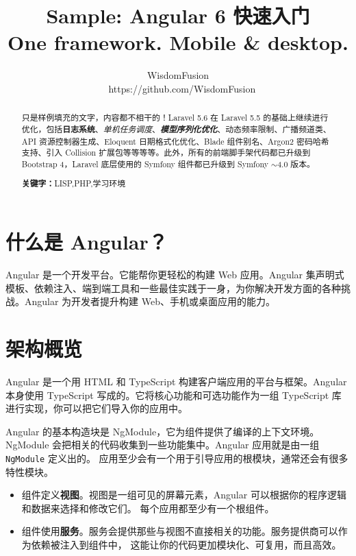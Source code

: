 \documentclass{codedump}
\title{\bfseries\sffamily
  Sample: Angular 6 快速入门\\
  \normalfont\zihao{-3}
  One framework. Mobile \& desktop.
}
\author{WisdomFusion \\ \faGithubAlt~ https://github.com/WisdomFusion}
\date{}
\begin{document}
\sloppy %


\maketitle
\thispagestyle{empty}


\begin{abstract}
\noindent 只是样例填充的文字，内容都不相干的！Laravel 5.6 在 Laravel 5.5 的基础上继续进行优化，包括\textbf{日志系统}、\textit{单机任务调度}、\textbf{\textit{模型序列化优化}}、动态频率限制、广播频道类、API 资源控制器生成、Eloquent 日期格式化优化、Blade 组件别名、Argon2 密码哈希支持、引入 Collision 扩展包等等等等。此外，所有的前端脚手架代码都已升级到 Bootstrap 4，Laravel 底层使用的 Symfony 组件都已升级到 Symfony $\sim$4.0 版本。

\vspace{2ex}
\noindent \textbf{关键字：}LISP,\hspace{.5em}PHP,\hspace{.5em}学习环境
\end{abstract}

\section{什么是 Angular？}
\label{newfeatures}

Angular 是一个开发平台。它能帮你更轻松的构建 Web 应用。Angular 集声明式模板、依赖注入、端到端工具和一些最佳实践于一身，为你解决开发方面的各种挑战。Angular 为开发者提升构建 Web、手机或桌面应用的能力。

\section{架构概览}

Angular 是一个用 HTML 和 TypeScript 构建客户端应用的平台与框架。Angular 本身使用 TypeScript 写成的。它将核心功能和可选功能作为一组 TypeScript 库进行实现，你可以把它们导入你的应用中。

Angular 的基本构造块是 NgModule，它为组件提供了编译的上下文环境。 NgModule 会把相关的代码收集到一些功能集中。Angular 应用就是由一组 \verb|NgModule| 定义出的。 应用至少会有一个用于引导应用的根模块，通常还会有很多特性模块。

\begin{itemize}
  \item 组件定义\textbf{视图}。视图是一组可见的屏幕元素，Angular 可以根据你的程序逻辑和数据来选择和修改它们。 每个应用都至少有一个根组件。
  
  \item 组件使用\textbf{服务}。服务会提供那些与视图不直接相关的功能。服务提供商可以作为依赖被注入到组件中， 这能让你的代码更加模块化、可复用，而且高效。
\end{itemize}
\end{document}

